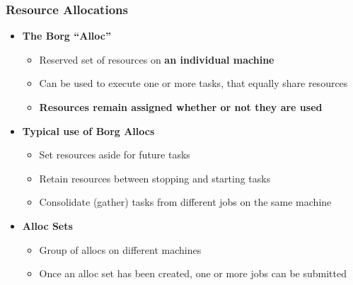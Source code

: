\begin{frame}
\frametitle{Resource Allocations}
\begin{itemize}
	\item {\bf The Borg ``Alloc''}
	\begin{itemize}
		\item Reserved set of resources on {\bf an individual machine}
		\item Can be used to execute one or more tasks, that equally share resources
		\item {\bf Resources remain assigned whether or not they are used}
	\end{itemize}

\vspace{20pt}

	\item {\bf Typical use of Borg Allocs}
	\begin{itemize}
		\item Set resources aside for future tasks
		\item Retain resources between stopping and starting tasks
		\item Consolidate (gather) tasks from different jobs on the same machine
	\end{itemize}

\vspace{20pt}

	\item {\bf Alloc Sets}
	\begin{itemize}
		\item Group of allocs on different machines
		\item Once an alloc set has been created, one or more jobs can be submitted
	\end{itemize}
\end{itemize}
\end{frame}

